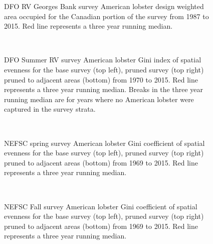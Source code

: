 \documentclass[11pt]{article}
\newcommand{\e}{/backup/bio_data/bio.lobster/figures/} %
\begin{document}
\begin{figure}

    \caption{DFO RV Georges Bank survey American lobster design weighted area occupied for the Canadian portion of the survey from 1987 to 2015. Red line represents a three year running median. }

\end{figure}



\begin{figure}
\centering
{}\\
\caption{DFO Summer RV survey American lobster Gini index of spatial evenness for the base survey (top left), pruned survey (top right) pruned to adjacent areas (bottom) from 1970 to 2015. Red line represents a three year running median. Breaks in the three year running median are for years where no American lobster were captured in the survey strata.}
\end{figure}
\clearpage


\begin{figure}
\centering
{}\\
\caption{NEFSC spring survey American lobster Gini coefficient of spatial evenness for the base survey (top left), pruned survey (top right) pruned to adjacent areas (bottom) from 1969 to 2015. Red line represents a three year running median.  }
\end{figure}
\clearpage



\begin{figure}
\centering
{}\\
\caption{NEFSC Fall survey American lobster Gini coefficient of spatial evenness for the base survey (top left), pruned survey (top right) pruned to adjacent areas (bottom) from 1969 to 2015. Red line represents a three year running median.  }
\end{figure}
\clearpage
\end{document}
